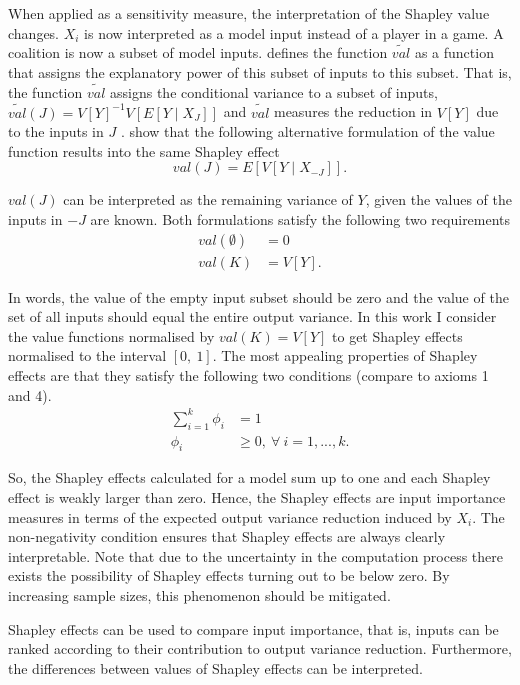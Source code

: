 When applied as a sensitivity measure, the interpretation of the Shapley value changes. $X_i$ is now interpreted as a model input instead of a player in a game. A coalition is now a subset of model inputs. \citet{O14} defines the function $\widetilde{val}$ as a function that assigns the explanatory power of this subset of inputs to this subset. That is, the function $\widetilde{val}$ assigns the conditional variance to a subset of inputs, $\widetilde{val}(J)=V[Y]^{-1}V[E[Y \mid X_J]]$ and $\widetilde{val}$ measures the reduction in $V[Y]$ due to the inputs in $J$ \citep{SNS16}. \citet{SNS16} show that the following alternative formulation of the value function results into the same Shapley effect
\begin{equation}
val(J)=E[V[Y \mid X_{- J}]].
\end{equation}

\noindent $val(J)$ can be interpreted as the remaining variance of $Y$, given the values of the inputs in $- J$ are known. Both formulations satisfy the following two requirements
\begin{align}
val(\emptyset)& = 0\\
val(K)& = V[Y].
\end{align}

\noindent In words, the value of the empty input subset should be zero and the value of the set of all inputs should equal the entire output variance. In this work I consider the value functions normalised by $val(K)=V[Y] $ to get Shapley effects normalised to the interval $ [0,\ 1] $. The most appealing properties of Shapley effects are that they satisfy the following two conditions (compare to axioms 1 and 4).
\begin{align}
\sum_{i=1}^{k}\phi_i& = 1\\
\phi_i& \geq 0,\ \forall \ i=1, ..., k.
\end{align}

\noindent So, the Shapley effects calculated for a model sum up to one and each Shapley effect is weakly larger than zero. Hence, the Shapley effects are input importance measures in terms of the expected output variance reduction induced by $X_i$. The non-negativity condition ensures that Shapley effects are always clearly interpretable. Note that due to the uncertainty in the computation process there exists the possibility of Shapley effects turning out to be below zero. By increasing sample sizes, this phenomenon should be mitigated.

Shapley effects can be used to compare input importance, that is, inputs can be ranked according to their contribution to output variance reduction. Furthermore, the differences between values of Shapley effects can be interpreted.

